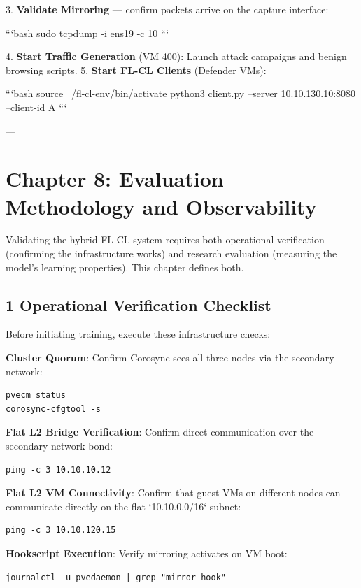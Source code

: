 \documentclass[conference]{IEEEtran}
\begin{document}
3. \textbf{Validate Mirroring} — confirm packets arrive on the capture interface:

    ```bash
    sudo tcpdump -i ens19 -c 10
    ```

4. \textbf{Start Traffic Generation} (VM 400): Launch attack campaigns and benign browsing scripts.
5. \textbf{Start FL-CL Clients} (Defender VMs):

    ```bash
    source ~/fl-cl-env/bin/activate
    python3 client.py --server 10.10.130.10:8080 --client-id A
    ```

---


\section{Chapter 8: Evaluation Methodology and Observability}

Validating the hybrid FL-CL system requires both operational verification (confirming the infrastructure works) and research evaluation (measuring the model's learning properties). This chapter defines both.


\subsection{1 Operational Verification Checklist}

Before initiating training, execute these infrastructure checks:

\textbf{Cluster Quorum}: Confirm Corosync sees all three nodes via the secondary network:

\begin{verbatim}
pvecm status
corosync-cfgtool -s
\end{verbatim}

\textbf{Flat L2 Bridge Verification}: Confirm direct communication over the secondary network bond:

\begin{verbatim}
ping -c 3 10.10.10.12
\end{verbatim}

\textbf{Flat L2 VM Connectivity}: Confirm that guest VMs on different nodes can communicate directly on the flat `10.10.0.0/16` subnet:

\begin{verbatim}
ping -c 3 10.10.120.15
\end{verbatim}

\textbf{Hookscript Execution}: Verify mirroring activates on VM boot:

\begin{verbatim}
journalctl -u pvedaemon | grep "mirror-hook"
\end{verbatim}
\end{document}
